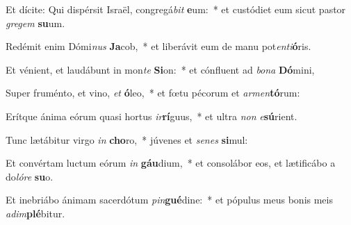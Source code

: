 \item Et dícite: Qui dispérsit Israël, congregá\textit{bit} \textbf{e}um:~* et custódiet eum sicut pastor \textit{gre}\textit{gem} \textbf{su}um.
\item Redémit enim Dómi\textit{nus} \textbf{Ja}cob,~* et liberávit eum de manu pot\textit{en}\textit{ti}\textbf{ó}ris.
\item Et vénient, et laudábunt in mon\textit{te} \textbf{Si}on:~* et cónfluent ad \textit{bo}\textit{na} \textbf{Dó}mini,
\item Super fruménto, et vino, \textit{et} \textbf{ó}leo,~* et fœtu pécorum et \textit{ar}\textit{men}\textbf{tó}rum:
\item Erítque ánima eórum quasi hortus \textit{ir}\textbf{rí}guus,~* et ultra \textit{non} \textit{e}\textbf{sú}rient.
\item Tunc lætábitur virgo \textit{in} \textbf{cho}ro,~* júvenes et \textit{se}\textit{nes} \textbf{si}mul:
\item Et convértam luctum eórum \textit{in} \textbf{gáu}dium,~* et consolábor eos, et lætificábo a do\textit{ló}\textit{re} \textbf{su}o.
\item Et inebriábo ánimam sacerdótum \textit{pin}\textbf{gué}dine:~* et pópulus meus bonis meis \textit{ad}\textit{im}\textbf{plé}bitur.
